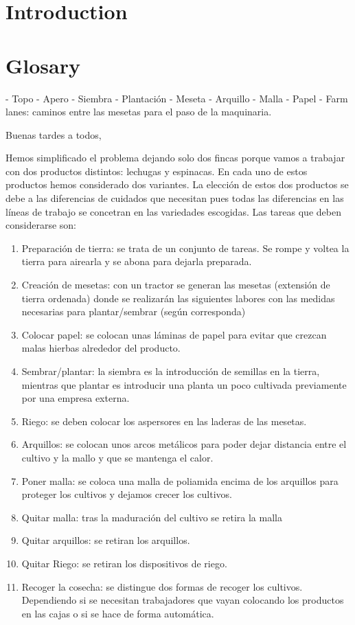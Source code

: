 
\chapter{Introduction}
% 

\chapter{Glosary}
- Topo
- Apero
- Siembra
- Plantación
- Meseta
- Arquillo
- Malla
- Papel
- Farm lanes: caminos entre las mesetas para el paso de la maquinaria.


% 



Buenas tardes a todos, 

Hemos simplificado el problema dejando solo dos fincas porque vamos a trabajar con dos productos distintos: lechugas y espinacas. 
En cada uno de estos productos hemos considerado dos variantes. 
La elección de estos dos productos se debe a las diferencias de cuidados que necesitan pues todas las diferencias en las líneas de 
trabajo se concetran en las variedades escogidas. 
Las tareas que deben considerarse son: 
\begin {enumerate}
    \item Preparación de tierra: se trata de un conjunto de tareas. Se rompe y voltea la tierra para airearla y se abona para dejarla 
    preparada.
    \item Creación de mesetas: con un tractor se generan las mesetas (extensión de tierra ordenada) donde se realizarán las siguientes
    labores con las medidas necesarias para plantar/sembrar (según corresponda)
    \item Colocar papel: se colocan unas láminas de papel para evitar que crezcan malas hierbas alrededor del producto. 
    \item Sembrar/plantar: la siembra es la introducción de semillas en la tierra, mientras que plantar es introducir una planta 
    un poco cultivada previamente por una empresa externa. 
    \item Riego: se deben colocar los aspersores en las laderas de las mesetas. 
    \item Arquillos: se colocan unos arcos metálicos para poder dejar distancia entre el cultivo y la mallo y que se mantenga el 
    calor.
    \item Poner malla: se coloca una malla de poliamida encima de los arquillos para proteger los cultivos y dejamos crecer los cultivos. 
    \item Quitar malla: tras la maduración del cultivo se retira la malla
    \item Quitar arquillos: se retiran los arquillos.
    \item Quitar Riego: se retiran los dispositivos de riego.
    \item Recoger la cosecha: se distingue dos formas de recoger los cultivos. Dependiendo si se necesitan trabajadores que vayan 
    colocando los productos en las cajas o si se hace de forma automática.
    
\end{enumerate}

